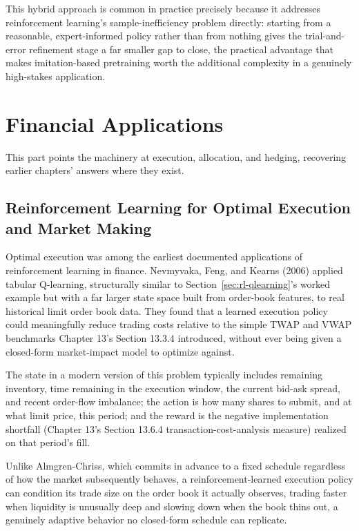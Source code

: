 \documentclass[../ai_in_finance]{subfiles}
\begin{document}
This hybrid approach is common in practice precisely because it addresses reinforcement learning's sample-inefficiency problem directly: starting from a reasonable, expert-informed policy rather than from nothing gives the trial-and-error refinement stage a far smaller gap to close, the practical advantage that makes imitation-based pretraining worth the additional complexity in a genuinely high-stakes application.

\section{Financial Applications}

This part points the machinery at execution, allocation, and hedging, recovering earlier chapters' answers where they exist.

\subsection{Reinforcement Learning for Optimal Execution and Market Making}
\label{sec:rl-execution}

Optimal execution was among the earliest documented applications of reinforcement learning in finance. Nevmyvaka, Feng, and Kearns (2006) applied tabular Q-learning, structurally similar to Section~\ref{sec:rl-qlearning}'s worked example but with a far larger state space built from order-book features, to real historical limit order book data. They found that a learned execution policy could meaningfully reduce trading costs relative to the simple TWAP and VWAP benchmarks Chapter 13's Section 13.3.4 introduced, without ever being given a closed-form market-impact model to optimize against.

The state in a modern version of this problem typically includes remaining inventory, time remaining in the execution window, the current bid-ask spread, and recent order-flow imbalance; the action is how many shares to submit, and at what limit price, this period; and the reward is the negative implementation shortfall (Chapter 13's Section 13.6.4 transaction-cost-analysis measure) realized on that period's fill.

Unlike Almgren-Chriss, which commits in advance to a fixed schedule regardless of how the market subsequently behaves, a reinforcement-learned execution policy can condition its trade size on the order book it actually observes, trading faster when liquidity is unusually deep and slowing down when the book thins out, a genuinely adaptive behavior no closed-form schedule can replicate.
\end{document}
